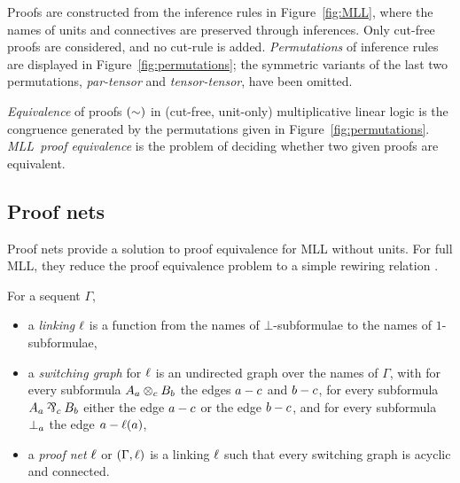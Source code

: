 \documentclass[conference]{IEEEtran}
\let\capsabbrev=\uppercase
\begin{document}
Proofs are constructed from the inference rules in Figure~\ref{fig:MLL}, where the names of units and connectives are preserved through inferences.
%
Only cut-free proofs are considered, and no cut-rule is added.
%
\emph{Permutations} of inference rules are displayed in Figure~\ref{fig:permutations}; the symmetric variants of the last two permutations, \emph{par-tensor} and \emph{tensor-tensor}, have been omitted.



\begin{definition}
\label{def:equivalence}
%
\emph{Equivalence} of proofs $(\perm)$ in (cut-free, unit-only) multiplicative linear logic is the congruence generated by the permutations given in Figure~\ref{fig:permutations}.
%
\emph{\capsabbrev{mll}\ proof equivalence} is the problem of deciding whether two given proofs are equivalent.
%
\end{definition}



\subsection*{Proof nets}

Proof nets provide a solution to proof equivalence for \capsabbrev{mll} without units.
%
For full \capsabbrev{mll}, they reduce the proof equivalence problem to a simple rewiring relation \cite{HughesMLLProofNets}.


\begin{definition}
\label{def:proof nets}
%
For a sequent $\Gamma$,
\begin{itemize}

	\item
	a \emph{linking} $\links$ is a function from the names of $\bot$-subformulae to the names of $1$-subformulae,

	\item
	a \emph{switching graph} for $\links$ is an undirected graph over the names of $\Gamma$, with for every subformula $\named aA\named c\tn\named bB$ the edges $\edge ac$ and $\edge bc$, for every subformula $\named aA\named c\parr\named bB$ either the edge $\edge ac$ or the edge $\edge bc$, and for every subformula $\named a\bot$ the edge $\edge a{\links(a)}$,

 	\item
	a \emph{proof net} $\links$ or $(\Gamma,\links)$ is a linking $\links$ such that every switching graph is acyclic and connected.

\end{itemize}
\end{definition}
\end{document}

